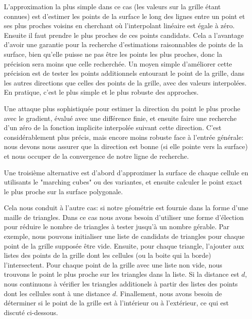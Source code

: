 \documentclass[11pt]{report}
\begin{document}
L'approximation la plus simple dans ce cas (les valeurs sur la grille étant connues) est d'estimer les points de la surface le long des lignes entre un point et ses plus proches voisins en cherchant où l'interpolant linéaire est égale à zéro. Ensuite il faut prendre le plus proches de ces points candidats. Cela a l'avantage d'avoir une garantie pour la recherche d'estimations raisonnables de points de la surface, bien qu'elle puisse ne pas être les points les plus proches, donc la précision sera moins que celle recherchée. Un moyen simple d'améliorer cette précision est de tester les points additionnels entourant le point de la grille, dans les autres directions que celles des points de la grille, avec des valeurs interpolées. En pratique, c'est le plus simple et le plus robuste des approches.\newline

Une attaque plus sophistiquée pour estimer la direction du point le plus proche avec le gradient, évalué avec une différence finie, et ensuite faire une recherche d'un zéro de la fonction implicite interpolée suivant cette direction. C'est considérablement plus précis, mais encore moins robuste face à l'entrée générale: nous devons nous assurer que la direction est bonne (si elle pointe vers la surface) et nous occuper de la convergence de notre ligne de recherche.\newline

Une troisième alternative est d'abord d'approximer la surface de chaque cellule en utilisants le "marching cubes" ou des variantes, et ensuite calculer le point exact le plus proche sur la surface polygonale.\newline

Cela nous conduit à l'autre cas: si notre géométrie est fournie dans la forme d'une maille de triangles. Dans ce cas nous avons besoin d'utiliser une forme d'élection pour réduire le nombre de triangles à tester jusqu'à un nombre gérable. Par exemple, nous pouvons initialiser une liste de candidats de triangles pour chaque point de la grille supposée être vide. Ensuite, pour chaque triangle, l'ajouter aux listes des points de la grille dont les cellules (ou la boite qui la borde) l'intersectent. Pour chaque point de la grille avec une liste non vide, nous trouvons le point le plus proche sur les triangles dans la liste. Si la distance est $d$, nous continuons à vérifier les triangles additionels à partir des listes des points dont les cellules sont à une distance $d$. Finallement, nous avons besoin de déterminer si le point de la grille est à l'intérieur ou à l'extérieur, ce qui est discuté ci-dessous.
\end{document}

